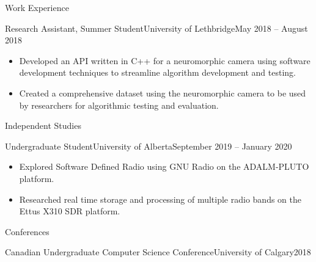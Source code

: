 \documentclass[]{mcdowellcv}
\begin{document}
\begin{cvsection}{Work Experience}
  \begin{cvsubsection}{Research Assistant, Summer Student}{University of Lethbridge}{May 2018 -- August 2018}	
    \vspace*{8pt}
    \begin{itemize}
      \item Developed an API written in C++ for a neuromorphic camera using software development techniques to streamline algorithm development and testing.
      \item Created a comprehensive dataset using the neuromorphic camera to be used by researchers for algorithmic testing and evaluation.
    \end{itemize}
  \end{cvsubsection}
\end{cvsection}

\vspace*{-10pt}
\begin{cvsection}{Independent Studies}
  \begin{cvsubsection}{Undergraduate Student}{University of Alberta}{September 2019 -- January 2020}
    \begin{itemize}
      \item Explored Software Defined Radio using GNU Radio on the ADALM-PLUTO platform.
      \item Researched real time storage and processing of multiple radio bands on the Ettus X310 SDR platform.
    \end{itemize}
  \end{cvsubsection}
\end{cvsection}

\vspace*{-10pt}
\begin{cvsection}{Conferences}
  \begin{cvsubsection}{Canadian Undergraduate Computer Science Conference}{University of Calgary}{2018}
  \end{cvsubsection}
\end{cvsection}
\end{document}
